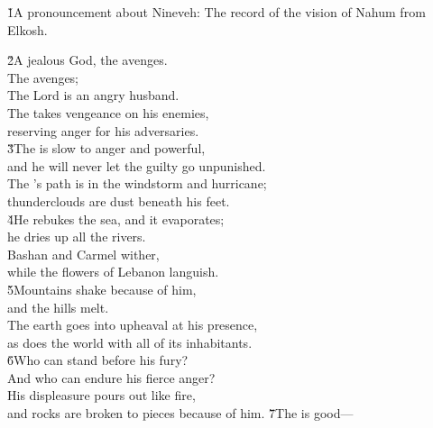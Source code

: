


\v{1}A pronouncement about Nineveh: The record of the vision of Nahum from Elkosh.

\begin{poetry}
\poeml \v{2}A jealous God, the  avenges. \\
\poemll    The  avenges; \\
\poeml The Lord is an angry husband. \\
\poeml The  takes vengeance on his enemies, \\
\poemll    reserving anger for his adversaries. \\
\poeml \v{3}The  is slow to anger and powerful, \\
\poemll    and he will never let the guilty go unpunished. \\
\poeml The 's path is in the windstorm and hurricane; \\
\poemll    thunderclouds are dust beneath his feet. \\
\poeml \v{4}He rebukes the sea, and it evaporates; \\
\poemll    he dries up all the rivers. \\
\poeml Bashan and Carmel wither, \\
\poemll    while the flowers of Lebanon languish. \\
\poeml \v{5}Mountains shake because of him, \\
\poemll    and the hills melt. \\
\poeml The earth goes into upheaval at his presence, \\
\poemll    as does the world with all of its inhabitants. \\
\poeml \v{6}Who can stand before his fury? \\
\poemll    And who can endure his fierce anger? \\
\poeml His displeasure pours out like fire, \\
\poemll    and rocks are broken to pieces because of him.
\poeml \v{7}The  is good--- \\

\end{poetry}
